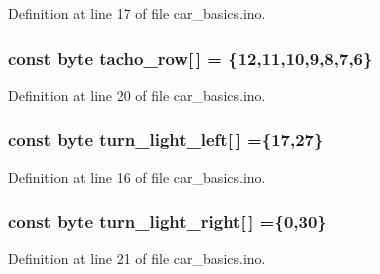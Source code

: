 Definition at line 17 of file car\+\_\+basics.\+ino.

\subsubsection[{\texorpdfstring{tacho\+\_\+row}{tacho_row}}]{\setlength{\rightskip}{0pt plus 5cm}const byte tacho\+\_\+row\mbox{[}$\,$\mbox{]} = \{12,11,10,9,8,7,6\}}\hypertarget{group__car_ga6ade605406f4c1ce9f03a5a2530f6dbe}{}\label{group__car_ga6ade605406f4c1ce9f03a5a2530f6dbe}


Definition at line 20 of file car\+\_\+basics.\+ino.

\subsubsection[{\texorpdfstring{turn\+\_\+light\+\_\+left}{turn_light_left}}]{\setlength{\rightskip}{0pt plus 5cm}const byte turn\+\_\+light\+\_\+left\mbox{[}$\,$\mbox{]} =\{17,27\}}\hypertarget{group__car_gac03fd0ab9cbcc53730039ad03e9b094d}{}\label{group__car_gac03fd0ab9cbcc53730039ad03e9b094d}


Definition at line 16 of file car\+\_\+basics.\+ino.

\subsubsection[{\texorpdfstring{turn\+\_\+light\+\_\+right}{turn_light_right}}]{\setlength{\rightskip}{0pt plus 5cm}const byte turn\+\_\+light\+\_\+right\mbox{[}$\,$\mbox{]} =\{0,30\}}\hypertarget{group__car_gaa5a6ee27fdf1d7c939cdf2a7266d7e84}{}\label{group__car_gaa5a6ee27fdf1d7c939cdf2a7266d7e84}


Definition at line 21 of file car\+\_\+basics.\+ino.

